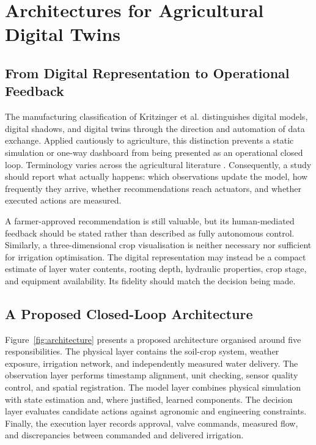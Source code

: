 \documentclass[acmsmall,screen,nonacm]{acmart}
\begin{document}
\section{Architectures for Agricultural Digital Twins}

\label{sec:3}

\subsection{From Digital Representation to Operational Feedback}

\label{sec:3-1}

The manufacturing classification of Kritzinger et al. \cite{R05} distinguishes digital models, digital shadows, and digital twins through the direction and automation of data exchange. Applied cautiously to agriculture, this distinction prevents a static simulation or one-way dashboard from being presented as an operational closed loop. Terminology varies across the agricultural literature \cite{R01,R02,R03,R04}. Consequently, a study should report what actually happens: which observations update the model, how frequently they arrive, whether recommendations reach actuators, and whether executed actions are measured.

A farmer-approved recommendation is still valuable, but its human-mediated feedback should be stated rather than described as fully autonomous control. Similarly, a three-dimensional crop visualisation is neither necessary nor sufficient for irrigation optimisation. The digital representation may instead be a compact estimate of layer water contents, rooting depth, hydraulic properties, crop stage, and equipment availability. Its fidelity should match the decision being made.

\subsection{A Proposed Closed-Loop Architecture}

\label{sec:3-2}

Figure~\ref{fig:architecture} presents a proposed architecture organised around five responsibilities. The physical layer contains the soil-crop system, weather exposure, irrigation network, and independently measured water delivery. The observation layer performs timestamp alignment, unit checking, sensor quality control, and spatial registration. The model layer combines physical simulation with state estimation and, where justified, learned components. The decision layer evaluates candidate actions against agronomic and engineering constraints. Finally, the execution layer records approval, valve commands, measured flow, and discrepancies between commanded and delivered irrigation.
\end{document}
